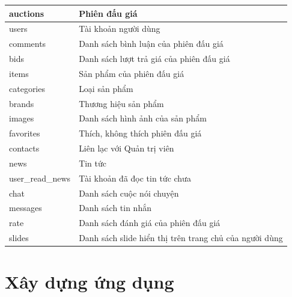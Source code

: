 \documentclass[../DoAn.tex]{subfiles}
\begin{document}
    \begin{supertabular}{| p{.30\textwidth} | p{.63\textwidth} |} 
    \hline
        auctions & Phiên đấu giá\\\hline
        users & Tài khoản người dùng\\\hline
        comments & Danh sách bình luận của phiên đấu giá\\\hline
        bids& Danh sách lượt trả giá của phiên đấu giá\\\hline
        items& Sản phẩm của phiên đấu giá\\\hline
        categories& Loại sản phẩm\\\hline
        brands& Thương hiệu sản phẩm\\\hline
        images& Danh sách hình ảnh của sản phẩm\\\hline
        favorites& Thích, không thích phiên đấu giá\\\hline
        contacts& Liên lạc với Quản trị viên\\\hline
        news& Tin tức\\\hline
        user\_read\_news& Tài khoản đã đọc tin tức chưa\\\hline
        chat& Danh sách cuộc nói chuyện\\\hline
        messages& Danh sách tin nhắn\\\hline
        rate& Danh sách đánh giá của phiên đấu giá\\\hline
        slides & Danh sách slide hiển thị trên trang chủ của người dùng\\\hline
    \end{supertabular}
\section{Xây dựng ứng dụng}
\end{document}
